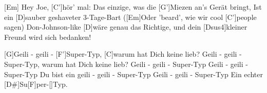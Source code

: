 \begin{guitar}
	[Em] Hey Joe, [C']hör' mal:
	Das einzige, was die [G']Miezen an's Gerät bringt,
	Ist ein [D]sauber geshaveter 3-Tage-Bart
	([Em]Oder 'beard', wie wir cool [C']people sagen)
	Don-Johnson-like [D]wäre genau das Richtige, 
	und dein [Dsus4]kleiner Freund wird sich bedanken!
	
	[G]Geili - geili - [F']Super-Typ, [C]warum hat Dich keine lieb?
	Geili - geili - Super-Typ, warum hat Dich keine lieb?
	Geili - geili - Super-Typ
	Geili - geili - Super-Typ
	Du bist ein geili - geili - Super-Typ
	Geili - geili - Super-Typ
	Ein echter [D#]Su[F]per-[]Typ.
\end{guitar}
